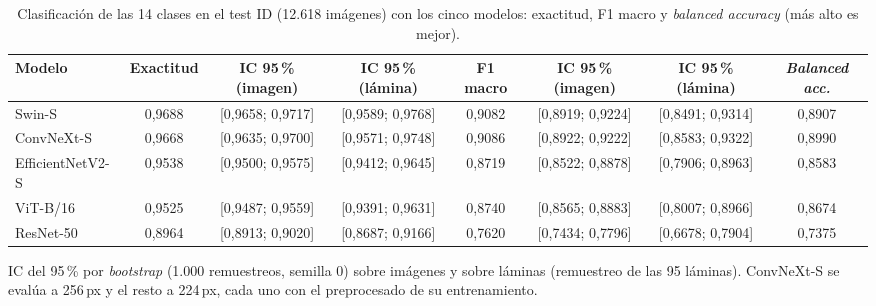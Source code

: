 \begin{table}
\centering
\scriptsize
\setlength{\tabcolsep}{3pt}
\caption{Clasificación de las 14 clases en el test ID (12.618 imágenes) con los cinco modelos: exactitud, F1 macro y \emph{balanced accuracy} (más alto es mejor).}
\label{tab:modelos}
\begin{tabular*}{\linewidth}{@{\extracolsep{\fill}}lccccccc}
\toprule
Modelo & Exactitud & IC 95\,\% (imagen) & IC 95\,\% (lámina) & F1 macro & IC 95\,\% (imagen) & IC 95\,\% (lámina) & \emph{Balanced acc.} \\
\midrule
Swin-S & 0{,}9688 & [0{,}9658; 0{,}9717] & [0{,}9589; 0{,}9768] & 0{,}9082 & [0{,}8919; 0{,}9224] & [0{,}8491; 0{,}9314] & 0{,}8907 \\
ConvNeXt-S & 0{,}9668 & [0{,}9635; 0{,}9700] & [0{,}9571; 0{,}9748] & 0{,}9086 & [0{,}8922; 0{,}9222] & [0{,}8583; 0{,}9322] & 0{,}8990 \\
EfficientNetV2-S & 0{,}9538 & [0{,}9500; 0{,}9575] & [0{,}9412; 0{,}9645] & 0{,}8719 & [0{,}8522; 0{,}8878] & [0{,}7906; 0{,}8963] & 0{,}8583 \\
ViT-B/16 & 0{,}9525 & [0{,}9487; 0{,}9559] & [0{,}9391; 0{,}9631] & 0{,}8740 & [0{,}8565; 0{,}8883] & [0{,}8007; 0{,}8966] & 0{,}8674 \\
ResNet-50 & 0{,}8964 & [0{,}8913; 0{,}9020] & [0{,}8687; 0{,}9166] & 0{,}7620 & [0{,}7434; 0{,}7796] & [0{,}6678; 0{,}7904] & 0{,}7375 \\
\bottomrule
\end{tabular*}

\smallskip
\parbox{\linewidth}{\scriptsize IC del 95\,\% por \emph{bootstrap} (1.000 remuestreos, semilla 0) sobre imágenes y sobre láminas (remuestreo de las 95 láminas). ConvNeXt-S se evalúa a 256\,px y el resto a 224\,px, cada uno con el preprocesado de su entrenamiento.}
\end{table}
